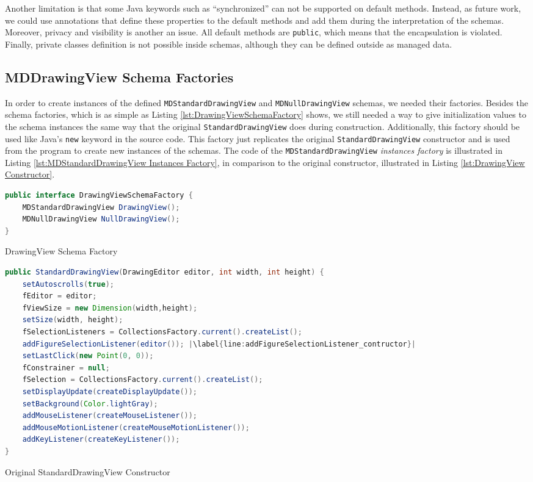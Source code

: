 Another limitation is that some Java keywords such as ``synchronized'' can not be supported on default methods.
Instead, as future work, we could use annotations that define these properties to the default methods and add them during the interpretation of the schemas.
Moreover, privacy and visibility is another an issue.
All default methods are \texttt{public}, which means that the encapsulation is violated.
Finally, private classes definition is not possible inside schemas, although they can be defined outside as managed data.

\subsection{MDDrawingView Schema Factories}
In order to create instances of the defined \texttt{MDStandardDrawingView} and \texttt{MDNullDrawingView} schemas, we needed their factories.
Besides the schema factories, which is as simple as Listing \ref{lst:DrawingViewSchemaFactory} shows, we still needed a way to give initialization values to the schema instances the same way that the original \texttt{StandardDrawingView} does during construction.
Additionally, this factory should be used like Java's \texttt{new} keyword in the source code.
This factory just replicates the original \texttt{StandardDrawingView} constructor and is used from the program to create new instances of the schemas.
The code of the \texttt{MDStandardDrawingView} \textit{instances factory} is illustrated in Listing \ref{lst:MDStandardDrawingView Instances Factory}, in comparison to the original constructor, illustrated in Listing \ref{lst:DrawingView Constructor}.

\begin{sourcecode}[H]
	\begin{lstlisting}[language=Java, escapechar=|]
public interface DrawingViewSchemaFactory {
	MDStandardDrawingView DrawingView();
	MDNullDrawingView NullDrawingView();
}
	\end{lstlisting}
	\caption{DrawingView Schema Factory}
	\label{lst:DrawingViewSchemaFactory}
\end{sourcecode}

\begin{sourcecode}[H]
	\begin{lstlisting}[language=Java, escapechar=|]
public StandardDrawingView(DrawingEditor editor, int width, int height) {
	setAutoscrolls(true);
	fEditor = editor;
	fViewSize = new Dimension(width,height);
	setSize(width, height);
	fSelectionListeners = CollectionsFactory.current().createList();
	addFigureSelectionListener(editor()); |\label{line:addFigureSelectionListener_contructor}|
	setLastClick(new Point(0, 0));
	fConstrainer = null;
	fSelection = CollectionsFactory.current().createList();
	setDisplayUpdate(createDisplayUpdate());
	setBackground(Color.lightGray);
	addMouseListener(createMouseListener());
	addMouseMotionListener(createMouseMotionListener());
	addKeyListener(createKeyListener());
}
	\end{lstlisting}
	\label{lst:DrawingView Constructor}
	\caption{Original StandardDrawingView Constructor}
\end{sourcecode}


